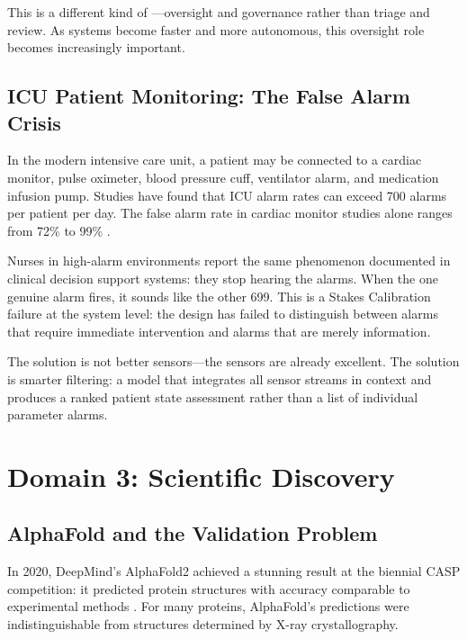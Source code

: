 This is a different kind of \hitl---oversight and governance rather than triage and review. As systems become faster and more autonomous, this oversight role becomes increasingly important.

\subsection{ICU Patient Monitoring: The False Alarm Crisis}

In the modern intensive care unit, a patient may be connected to a cardiac monitor, pulse oximeter, blood pressure cuff, ventilator alarm, and medication infusion pump. Studies have found that ICU alarm rates can exceed 700 alarms per patient per day. The false alarm rate in cardiac monitor studies alone ranges from 72\% to 99\% \autocite{cvach2012monitor}.

\begin{cautionbox}
Nurses in high-alarm environments report the same phenomenon documented in clinical decision support systems: they stop hearing the alarms. When the one genuine alarm fires, it sounds like the other 699. This is a Stakes Calibration failure at the system level: the \hitl design has failed to distinguish between alarms that require immediate intervention and alarms that are merely information.
\end{cautionbox}

The solution is not better sensors---the sensors are already excellent. The solution is smarter filtering: a model that integrates all sensor streams in context and produces a ranked patient state assessment rather than a list of individual parameter alarms.

\section{Domain 3: Scientific Discovery}
\label{sec:scientific-discovery}

\subsection{AlphaFold and the Validation Problem}

In 2020, DeepMind's AlphaFold2 achieved a stunning result at the biennial CASP competition: it predicted protein structures with accuracy comparable to experimental methods \autocite{jumper2021alphafold}. For many proteins, AlphaFold's predictions were indistinguishable from structures determined by X-ray crystallography.

